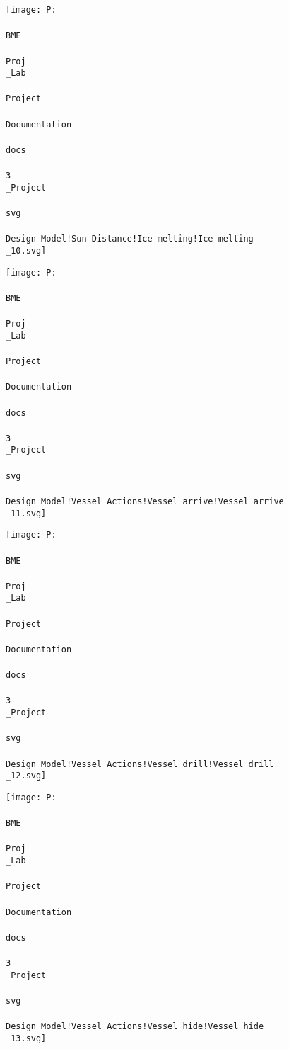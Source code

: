 \begin{figure}[H] 
\texttt{[image: P:\\\\BME\\\\Proj\\\_Lab\\\\Project\\\\Documentation\\\\docs\\\\3\\\_Project\\\\svg\\\\Design Model!Sun Distance!Ice melting!Ice melting\\\_10.svg]} 
\centering 
\caption{}\end{figure} 

\begin{figure}[H] 
\texttt{[image: P:\\\\BME\\\\Proj\\\_Lab\\\\Project\\\\Documentation\\\\docs\\\\3\\\_Project\\\\svg\\\\Design Model!Vessel Actions!Vessel arrive!Vessel arrive\\\_11.svg]} 
\centering 
\caption{}\end{figure} 

\begin{figure}[H] 
\texttt{[image: P:\\\\BME\\\\Proj\\\_Lab\\\\Project\\\\Documentation\\\\docs\\\\3\\\_Project\\\\svg\\\\Design Model!Vessel Actions!Vessel drill!Vessel drill\\\_12.svg]} 
\centering 
\caption{}\end{figure} 

\begin{figure}[H] 
\texttt{[image: P:\\\\BME\\\\Proj\\\_Lab\\\\Project\\\\Documentation\\\\docs\\\\3\\\_Project\\\\svg\\\\Design Model!Vessel Actions!Vessel hide!Vessel hide\\\_13.svg]} 
\centering 
\caption{}\end{figure} 


